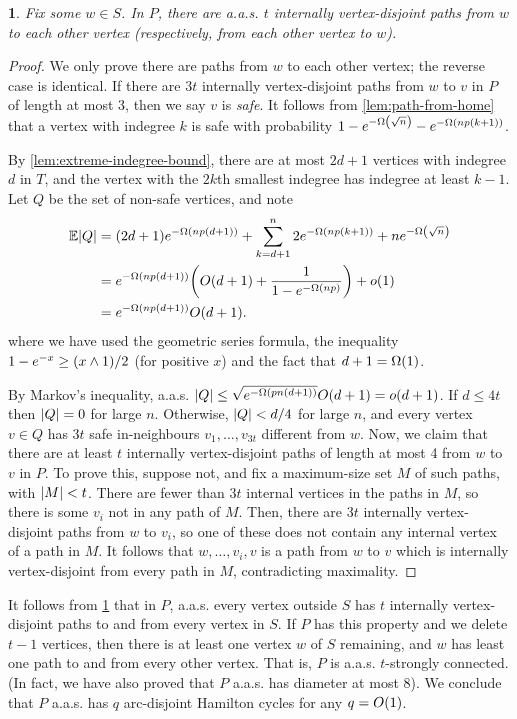 \documentclass[11pt,english]{article}
\theoremstyle{plain}
\theoremstyle{definition}
\theoremstyle{definition}
\theoremstyle{plain}
\theoremstyle{plain}
\theoremstyle{plain}
\newtheorem{lem}[thm]{\protect\lemmaname}
\theoremstyle{plain}
\theoremstyle{remark}
\theoremstyle{remark}
\let\originalleft\left
\let\originalright\right
\renewcommand{\left}{\mathopen{}\mathclose\bgroup\originalleft}
\renewcommand{\right}{\aftergroup\egroup\originalright}
\providecommand{\lemmaname}{Lemma}
\begin{document}
\begin{lem}
\label{lem:lots-of-paths}Fix some $w\in S$. In $P$, there are a.a.s.
$t$ internally vertex-disjoint paths from $w$ to each other vertex (respectively,
from each other vertex to $w$).\end{lem}
\begin{proof}
We only prove there are paths from $w$ to each other vertex; the
reverse case is identical. If there are $3t$ internally vertex-disjoint paths from $w$ to $v$ in $P$ of length
at most 3, then we say $v$ is \emph{safe}. It follows
from \ref{lem:path-from-home} that a vertex with indegree $k$ is
safe with probability $1-e^{-\Omega\left(\sqrt{n}\right)}-e^{-\Omega\left(np\left(k+1\right)\right)}$.

By \ref{lem:extreme-indegree-bound}, there are at most $2d+1$
vertices with indegree $d$ in $T$, and the vertex with the $2k$th smallest
indegree has indegree at least $k-1$. Let $Q$ be the set of non-safe
vertices, and note
\begin{align*}
\E\left|Q\right| & =\left(2d+1\right)e^{-\Omega\left(np\left(d+1\right)\right)}+\sum_{k=d+1}^{n}2e^{-\Omega\left(np\left(k+1\right)\right)}+ne^{-\Omega\left(\sqrt{n}\right)}\\
 & =e^{-\Omega\left(np\left(d+1\right)\right)}\left(O\left(d+1\right)+\frac{1}{1-e^{-\Omega\left(np\right)}}\right)+o\left(1\right)\\
 & =e^{-\Omega\left(np\left(d+1\right)\right)}O\left(d+1\right).
\end{align*}
where we have used the geometric series formula, the inequality $1-e^{-x}\ge\left(x\land1\right)/2$
(for positive $x$) and the fact that $d+1=\Omega\left(1\right)$.

By Markov's inequality, a.a.s. $\left|Q\right|\le\sqrt{e^{-\Omega\left(pn\left(d+1\right)\right)}}O\left(d+1\right)=o\left(d+1\right)$.
If $d\le4t$ then $\left|Q\right|=0$ for large $n$. Otherwise, $\left|Q\right|<d/4$ for large $n$, and every vertex $v\in Q$ has
$3t$ safe in-neighbours $v_{1},\dots,v_{3t}$ different from $w$. Now, we claim that there are at least $t$ internally vertex-disjoint paths of length at most 4 from $w$ to $v$ in $P$. To prove this, suppose not, and fix a maximum-size set
$M$ of such paths, with $\left|M\right|<t$. There are fewer than $3t$ internal vertices in the paths in $M$, so there is some $v_{i}$ not in any path of $M$. Then, there are $3t$ internally vertex-disjoint paths from $w$ to $v_{i}$, so one of these does not contain any
internal vertex of a path in $M$. It follows that $w,\dots,v_{i},v$ is a path from $w$ to $v$ which is
internally vertex-disjoint from every path in $M$, contradicting maximality.
\end{proof}
It follows from \ref{lem:lots-of-paths} that in $P$, a.a.s. every vertex
outside $S$ has $t$ internally vertex-disjoint paths to and from every vertex in $S$.
If $P$ has this property and we delete $t-1$ vertices, then there is at least one vertex $w$
of $S$ remaining, and $w$ has least one path to and from every other
vertex. That is, $P$ is a.a.s. $t$-strongly connected. (In fact, we have also
proved that $P$ a.a.s. has diameter at most 8). We conclude that $P$ a.a.s. has $q$ arc-disjoint Hamilton cycles for any $q=O\left(1\right)$.
\end{document}
